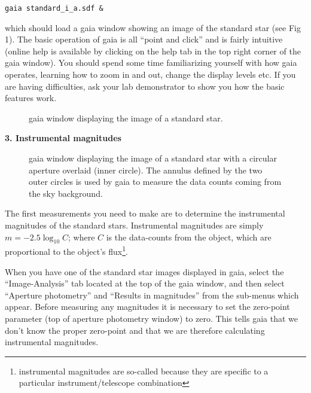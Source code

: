 {\tt \verb,gaia standard_i_a.sdf &,}

which should load a {\sc gaia} window showing an image of the standard
star (see Fig 1). The basic operation of {\sc gaia} is all ``point and
click'' and is fairly intuitive (online help is available by
clicking on the {\sc help} tab in the top right corner of the {\sc
gaia} window). You should spend some time familiarizing yourself with
how {\sc gaia} operates, learning how to zoom in and out, change the
display levels etc. If you are having difficulties, ask your lab
demonstrator to show you how the basic features work.

\newpage

\begin{figure}
\centerline{}
\caption{{\sc gaia} window displaying the image of a standard star.}
\end{figure}

{\large{\bf 3. Instrumental magnitudes}}

\begin{figure}
\centerline{}
\caption{{\sc gaia} window displaying the image of a standard star
with a circular aperture overlaid (inner circle). The annulus defined
by the two outer circles is used by {\sc gaia} to measure the data
counts coming from the sky background.}
\end{figure}
The first measurements you need to make are to determine the
instrumental magnitudes of the standard stars. Instrumental magnitudes
are simply $m = -2.5\log_{10} C$; where $C$ is the data-counts from
the object, which are proportional to the object's
flux\footnote{instrumental magnitudes are so-called because they
are specific to a particular instrument/telescope combination}. 

When you have one of the standard star images displayed 
in {\sc gaia}, select the ``Image-Analysis'' tab located at
the top of the {\sc gaia} window, and then select ``Aperture photometry''
and ``Results in magnitudes'' from the sub-menus which appear. 
Before measuring any magnitudes it is necessary to set 
the zero-point parameter (top of aperture photometry window) to zero. 
This tells {\sc gaia} that we don't know the proper zero-point and
that we are therefore calculating instrumental magnitudes. 

